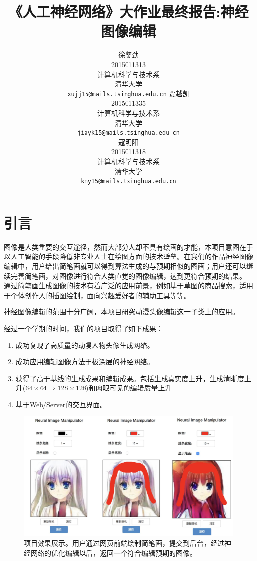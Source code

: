 \documentclass[a4paper,12pt,UTF8]{ctexart}
\title{《人工神经网络》大作业最终报告:神经图像编辑}
\author{
  徐鉴劲 \\
  2015011313 \\
  计算机科学与技术系 \\
  清华大学 \\
  \texttt{xujj15@mails.tsinghua.edu.cn}
  \AND
  贾越凯 \\
  2015011335 \\
  计算机科学与技术系 \\
  清华大学 \\
  \texttt{jiayk15@mails.tsinghua.edu.cn} \\
  \AND
  寇明阳 \\
  2015011318 \\
  计算机科学与技术系 \\
  清华大学 \\
  \texttt{kmy15@mails.tsinghua.edu.cn} \\
}
\newcommand{\kai}{\CJKfamily{zhkai}}	%
\begin{document}
\maketitle

\begin{abstract}

\end{abstract}


\section{引言}

图像是人类重要的交互途径，然而大部分人却不具有绘画的才能，本项目意图在于以人工智能的手段降低非专业人士在绘图方面的技术壁垒。在我们的作品神经图像编辑中，用户给出简笔画就可以得到算法生成的与预期相似的图画；用户还可以继续完善简笔画，对图像进行符合人类直觉的图像编辑，达到更符合预期的结果。
通过简笔画生成图像的技术有着广泛的应用前景，例如基于草图的商品搜索，适用于个体创作人的插图绘制，面向兴趣爱好者的辅助工具等等。

神经图像编辑的范围十分广阔，本项目研究动漫头像编辑这一子类上的应用。

经过一个学期的时间，我们的项目取得了如下成果：

\begin{enumerate}
\item 成功复现了高质量的动漫人物头像生成网络。
\item 成功应用编辑图像方法于极深层的神经网络。
\item 获得了高于基线的生成成果和编辑成果。包括生成真实度上升，生成清晰度上升($64 \times 64 \Rightarrow 128 \times 128$)和肉眼可见的编辑质量上升
\item 基于Web/Server的交互界面。
\end{enumerate}

\begin{figure}[H]
  \centering
  \includegraphics[width=0.9\linewidth]{figs/frontend.pdf}
  \caption{\kai 项目效果展示。用户通过网页前端绘制简笔画，提交到后台，经过神经网络的优化编辑以后，返回一个符合编辑预期的图像。}
  \label{fig:frontend}
\end{figure}
\end{document}
